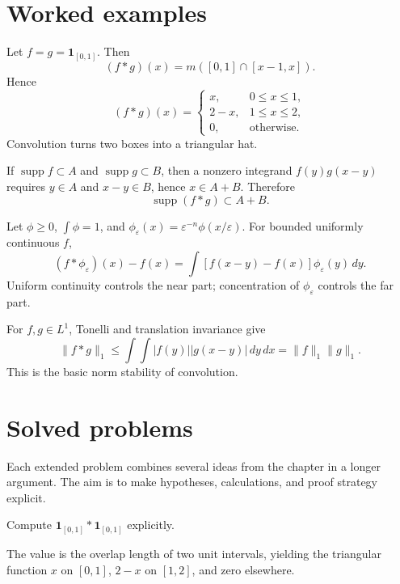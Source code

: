 \section{Worked examples}

\begin{example}\label{ex:iii10-worked-01}
Let \(f=g=\mathbf1_{[0,1]}\). Then
\[
(f*g)(x)=m([0,1]\cap[x-1,x]).
\]
Hence
\[
(f*g)(x)=
\begin{cases}
x,&0\le x\le1,\\
2-x,&1\le x\le2,\\
0,&\text{otherwise}.
\end{cases}
\]
Convolution turns two boxes into a triangular hat.
\end{example}

\begin{example}\label{ex:iii10-worked-02}
If \(\operatorname{supp}f\subset A\) and \(\operatorname{supp}g\subset B\),
then a nonzero integrand \(f(y)g(x-y)\) requires \(y\in A\) and \(x-y\in B\),
hence \(x\in A+B\). Therefore
\[
\operatorname{supp}(f*g)\subset A+B.
\]
\end{example}

\begin{example}\label{ex:iii10-worked-03}
Let \(\phi\ge0\), \(\int\phi=1\), and
\(\phi_\varepsilon(x)=\varepsilon^{-n}\phi(x/\varepsilon)\). For bounded
uniformly continuous \(f\),
\[
(f*\phi_\varepsilon)(x)-f(x)
=\int [f(x-y)-f(x)]\phi_\varepsilon(y)\,dy.
\]
Uniform continuity controls the near part; concentration of
\(\phi_\varepsilon\) controls the far part.
\end{example}

\begin{example}\label{ex:iii10-worked-04}
For \(f,g\in L^1\), Tonelli and translation invariance give
\[
\|f*g\|_1
\le\int\!\!\int |f(y)||g(x-y)|\,dy\,dx
=\|f\|_1\|g\|_1.
\]
This is the basic norm stability of convolution.
\end{example}

\section{Solved problems}
Each extended problem combines several ideas from the chapter in a longer argument. The aim is to make hypotheses, calculations, and proof strategy explicit.

\begin{problem}\label{prob:iii10-problem-01}
Compute \(\mathbf1_{[0,1]}*\mathbf1_{[0,1]}\) explicitly.
\end{problem}
\begin{solution}
The value is the overlap length of two unit intervals, yielding the triangular
function \(x\) on \([0,1]\), \(2-x\) on \([1,2]\), and zero elsewhere.
\end{solution}

